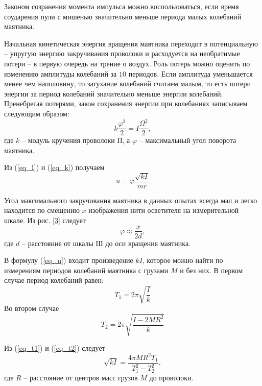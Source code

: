 \documentclass[a4paper,12pt]{article}
\begin{document}
Законом созранения момента импульса можно воспользоваться, если время соударения пули с мишенью значительно меньше периода малых колебаний маятника.

Начальная кинетическая энергия вращения маятника переходит в потенциальную -- упругую энергию закручивания проволоки и расходуется на необратимые потери -- в первую очередь на трение о воздух. Роль потерь можно оценить по изменению амплитуды колебаний за $10$ периодов. Если амплитуда уменьшается менее чем наполовину, то затухание колебаний считаем малым, то есть потери энергии за период колебаний значительно меньше энергии колебаний. Пренебрегая потерями, закон сохранения энергии при колебаниях записываем следующим образом: 
\begin{equation}
    \label{eq_k}
    k\frac{\varphi^2}{2} = I\frac{\Omega^2}{2},
\end{equation}
где $k$ -- модуль кручения проволоки П, а $\varphi$ -- максимальный угол поворота маятника.

Из (\ref{eq_I}) и (\ref{eq_k}) получаем 
\begin{equation}
    \label{eq_u}
    u = \varphi\frac{\sqrt{kI}}{mr}
\end{equation}

Угол максимального закручивания маятника в данных опытах всегда мал и легко находится по смещению $x$ изображения нити осветителя на измерительной шкале. Из рис. \ref{3} следует
\begin{equation}
    \label{eq_varphi}
    \varphi \approx \frac{x}{2d},
\end{equation}
где $d$ -- расстояние от шкалы Ш до оси вращения маятника.

В формулу (\ref{eq_u}) входит произведение $kI$, которое можно найти по измерениям периодов колебаний маятника с грузами $M$ и без них. В первом случае период колебаний равен: 
\begin{equation}
    \label{eq_t1}
    T_1 = 2\pi \sqrt{\frac{I}{k}}
\end{equation}
Во втором случае 
\begin{equation}
    \label{eq_t2}
    T_2 = 2\pi \sqrt{\frac{I - 2MR^2}{k}}
\end{equation}

Из (\ref{eq_t1}) и (\ref{eq_t2}) следует 
\begin{equation}
    \label{eq_kI}
    \sqrt{kI} = \frac{4\pi MR^2T_1}{T_1^2 - T_2^2},
\end{equation}
где $R$ -- расстояние от центров масс грузов $M$ до проволоки.
\end{document}
